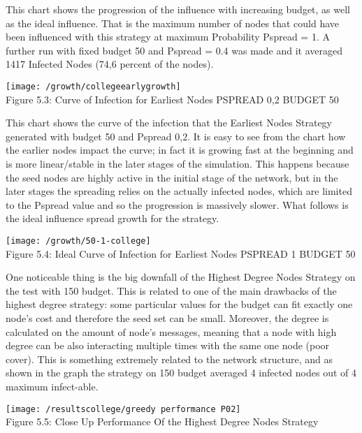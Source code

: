 This chart shows the progression of the influence with increasing budget, as well as the ideal influence. That is the maximum number of nodes that could have been influenced with this strategy at maximum Probability Pspread = 1. A further run with fixed budget 50 and Pspread = 0.4 was made and it averaged 1417 Infected Nodes (74,6 percent of the nodes). 

\begin{center}
    \texttt{[image: /growth/collegeearlygrowth]}
    \\
    Figure 5.3: Curve of Infection for Earliest Nodes PSPREAD 0,2 BUDGET 50
\end{center}
This  chart shows the curve of the infection that the Earliest Nodes Strategy generated with budget 50 and Pspread 0,2. It is easy to see from the chart how the earlier nodes impact the curve; in fact it is growing fast at the beginning and is more linear/stable in the later stages of the simulation. This happens because the seed nodes are highly active in the initial stage of the network, but in the later stages the spreading relies on the actually infected nodes, which are limited to the Pspread value and so the progression is massively slower. What follows is the ideal influence spread growth for the strategy.

\begin{center}
    \texttt{[image: /growth/50-1-college]}
    \\
    Figure 5.4: Ideal Curve of Infection for Earliest Nodes PSPREAD 1 BUDGET 50
\end{center}

One noticeable thing is the big downfall of the Highest Degree Nodes Strategy on the test with 150 budget. This is related to one of the main drawbacks of the highest degree strategy: some particular values for the budget can fit exactly one node's cost and therefore the seed set can be small. Moreover, the degree is calculated on the amount of node's messages, meaning that a node with high degree can be also interacting multiple times with the same one node (poor cover). This is something extremely related to the network structure, and as shown in the graph the strategy on 150 budget averaged 4 infected nodes out of 4 maximum infect-able.

\begin{center}
    \texttt{[image: /resultscollege/greedy performance P02]}
    \\
    Figure 5.5: Close Up Performance Of the Highest Degree Nodes Strategy
\end{center}

